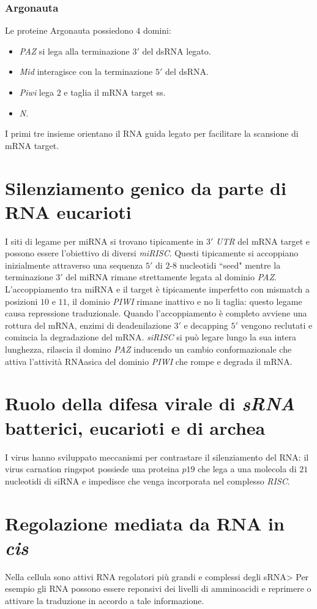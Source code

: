 \subsubsection{Argonauta}
Le proteine Argonauta possiedono $4$ domini: 
\begin{itemize}
	\item \emph{PAZ} si lega alla terminazione $3'$ del dsRNA legato.
	\item \emph{Mid} interagisce con la terminazione $5'$ del dsRNA.
	\item \emph{Piwi} lega $2$ \emph{} e taglia il mRNA target ss.
	\item \emph{N}.
\end{itemize}
I primi tre insieme orientano il RNA guida legato per facilitare la scansione di mRNA target. 
\section{Silenziamento genico da parte di RNA eucarioti}
I siti di legame per miRNA si trovano tipicamente in $3'$ \emph{UTR} del mRNA target e possono essere l'obiettivo di diversi \emph{miRISC}. Questi tipicamente si accoppiano inizialmente
attraverso una sequenza $5'$ di $2$-$8$ nucleotidi ``seed" mentre la terminazione $3'$ del miRNA rimane strettamente legata al dominio \emph{PAZ}. L'accoppiamento tra miRNA e il target
\`e tipicamente imperfetto con mismatch a posizioni $10$ e $11$, il dominio \emph{PIWI} rimane inattivo e no li taglia: questo legame causa repressione traduzionale. Quando 
l'accoppiamento \`e completo avviene una rottura del mRNA, enzimi di deadenilazione $3'$ e decapping $5'$ vengono reclutati e comincia la degradazione del mRNA. \emph{siRISC} si pu\`o
legare lungo la sua intera lunghezza, rilascia il domino \emph{PAZ} inducendo un cambio conformazionale che attiva l'attivit\`a RNAasica del dominio \emph{PIWI} che rompe e degrada il
mRNA. 
\section{Ruolo della difesa virale di \emph{sRNA} batterici, eucarioti e di archea}
I virus hanno sviluppato meccanismi per contrastare il silenziamento del RNA: il virus carnation ringspot possiede una proteina $p19$ che lega a una molecola di $21$ nucleotidi di 
siRNA e impedisce che venga incorporata nel complesso \emph{RISC}. 
\section{Regolazione mediata da RNA in \emph{cis}}
Nella cellula sono attivi RNA regolatori pi\`u grandi e complessi degli sRNA> Per esempio gli RNA possono essere reponsivi dei livelli di amminoacidi e reprimere o attivare la traduzione
in accordo a tale informazione. 
